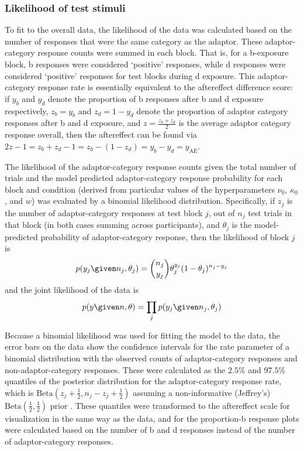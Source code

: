 \subsubsection{Likelihood of test stimuli}
\label{sec:likel-test-stim}

To fit to the overall data, the likelihood of the data was calculated based on the number of responses that were the same category as the adaptor.  These adaptor-category response counts were summed in each block.  That is, for a \ph b-exposure block, \ph b responses were considered `positive' responses, while \ph d responses were considered `positive' responses for test blocks during \ph d exposure.  This adaptor-category response rate is essentially equivalent to the aftereffect difference score: if $y_b$ and $y_d$ denote the proportion of \ph b responses after \ph b and \ph d exposure respectively, $z_b=y_b$ and $z_d = 1-y_d$ denote the proportion of adaptor category responses after \ph b and \ph d exposure, and $z = \frac{z_b+z_d}{2}$ is the average adaptor category response overall, then the aftereffect can be found via $2z - 1 = z_b+z_d - 1= z_b - (1-z_d)  = y_b - y_d = y_\mathrm{AE}$.

The likelihood of the adaptor-category response counts given the total number of trials and the model predicted adaptor-category response probability for each block and condition (derived from particular values of the hyperparameters $\nu_0$, $\kappa_0$, and $w$) was evaluated by a binomial likelihood distribution.  Specifically, if $z_j$ is the number of adaptor-category responses at test block $j$, out of $n_j$ test trials in that block (in both cases summing across participants), and $\theta_j$ is the model-predicted probability of adaptor-category response, then the likelihood of block $j$ is
\begin{equation}
  p(y_j \given n_j, \theta_j) = \binom{n_j}{y_j} \theta_j ^ {y_j} (1-\theta_j)^{n_j - y_j}
\end{equation}
and the joint likelihood of the data is
\begin{equation}
  p(y \given n, \theta) = \prod_j p(y_j \given n_j,\theta_j)
\end{equation}

Because a binomial likelihood was used for fitting the model to the data, the error bars on the data show the confidence intervals for the rate parameter of a binomial distribution with the observed counts of adaptor-category responses and non-adaptor-category responses.  These were calculated as the $2.5\%$ and $97.5\%$ quantiles of the posterior distribution for the adaptor-category response rate, which is $\mathrm{Beta} (z_j+\frac{1}{2}, n_j-z_j+\frac{1}{2})$ assuming a non-informative (Jeffrey's) $\mathrm{Beta}(\frac{1}{2}, \frac{1}{2})$ prior \autocite{Gelman2003}.  These quantiles were transformed to the aftereffect scale for visualization in the same way as the data, and for the proportion-\ph b response plots were calculated based on the number of \ph b and \ph d responses instead of the number of adaptor-category responses.

